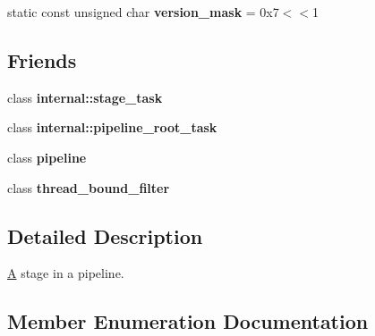 \begin{DoxyCompactItemize}
\item 
\hypertarget{classtbb_1_1filter_a8d0e7e5e2fd9141b71c1073f6609df91}{}static const unsigned char {\bfseries version\+\_\+mask} = 0x7$<$$<$1\label{classtbb_1_1filter_a8d0e7e5e2fd9141b71c1073f6609df91}

\end{DoxyCompactItemize}
\subsection*{Friends}
\begin{DoxyCompactItemize}
\item 
\hypertarget{classtbb_1_1filter_a88bd11ed4d74f6de43a7d3b0bc05f2c3}{}class {\bfseries internal\+::stage\+\_\+task}\label{classtbb_1_1filter_a88bd11ed4d74f6de43a7d3b0bc05f2c3}

\item 
\hypertarget{classtbb_1_1filter_aa6f9dcf41617866d7bf0e72d8efc11e7}{}class {\bfseries internal\+::pipeline\+\_\+root\+\_\+task}\label{classtbb_1_1filter_aa6f9dcf41617866d7bf0e72d8efc11e7}

\item 
\hypertarget{classtbb_1_1filter_a687d6d86bc5e18eb1d32acf3f6e7bd9f}{}class {\bfseries pipeline}\label{classtbb_1_1filter_a687d6d86bc5e18eb1d32acf3f6e7bd9f}

\item 
\hypertarget{classtbb_1_1filter_ab4463cf8612c362ee109224e45fad104}{}class {\bfseries thread\+\_\+bound\+\_\+filter}\label{classtbb_1_1filter_ab4463cf8612c362ee109224e45fad104}

\end{DoxyCompactItemize}


\subsection{Detailed Description}
\hyperlink{structA}{A} stage in a pipeline. 



\subsection{Member Enumeration Documentation}
\hypertarget{classtbb_1_1filter_a8145c736bafcf0b401d50bf1a1df9125}{}
